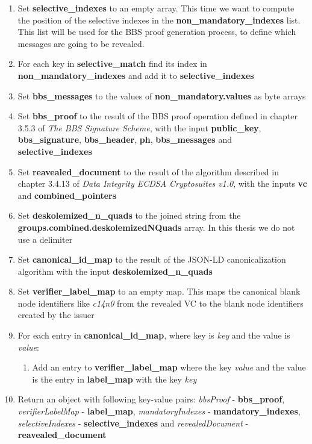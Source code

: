 \documentclass[
	a4paper               %
	,BCOR=0mm            %
	,bibliography=totoc   %
	,listof=totoc         %
	,monolingual
	,twoside=false
]{bfhthesis}              %
\begin{document}
\begin{enumerate}
	\item Set \textbf{selective\_indexes} to an empty array. This time we want to compute the position of the selective indexes in the \textbf{non\_mandatory\_indexes} list. This list will be used for the BBS proof generation process, to define which messages are going to be revealed.
	\item For each key in \textbf{selective\_match} find its index in \textbf{non\_mandatory\_indexes} and add it to \textbf{selective\_indexes}
	\item Set \textbf{bbs\_messages} to the values of \textbf{non\_mandatory.values} as byte arrays
	\item Set \textbf{bbs\_proof} to the result of the BBS proof operation defined in chapter 3.5.3 of \textit{The BBS Signature Scheme}\cite{bbs-signature-scheme}, with the input \textbf{public\_key}, \textbf{bbs\_signature}, \textbf{bbs\_header}, \textbf{ph}, \textbf{bbs\_messages} and \textbf{selective\_indexes}
	\item Set \textbf{reavealed\_document} to the result of the algorithm described in chapter 3.4.13 of \textit{Data Integrity ECDSA Cryptosuites v1.0}\cite{ecdsa}, with the inputs \textbf{vc} and \textbf{combined\_pointers}
	\item Set \textbf{deskolemized\_n\_quads} to the joined string from the \textbf{groups.combined.deskolemizedNQuads} array. In this thesis we do not use a delimiter
	\item Set \textbf{canonical\_id\_map} to the result of the JSON-LD canonicalization algorithm with the input \textbf{deskolemized\_n\_quads}
	\item Set \textbf{verifier\_label\_map} to an empty map. This maps the canonical blank node identifiers like \textit{c14n0} from the revealed VC to the blank node identifiers created by the issuer
	\item For each entry in \textbf{canonical\_id\_map}, where key is \textit{key} and the value is \textit{value}:
	\begin{enumerate}
		\item Add an entry to \textbf{verifier\_label\_map} where the key \textit{value} and the value is the entry in \textbf{label\_map} with the key \textit{key}
	\end{enumerate}
	\item Return an object with following key-value pairs: \textit{bbsProof} - \textbf{bbs\_proof}, \textit{verifierLabelMap} - \textbf{label\_map}, \textit{mandatoryIndexes} - \textbf{mandatory\_indexes}, \textit{selectiveIndexes} - \textbf{selective\_indexes} and \textit{revealedDocument} - \textbf{reavealed\_document}
\end{enumerate}
\end{document}
